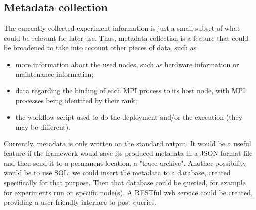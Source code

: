 \subsection{Metadata collection}
The currently collected experiment information is just a small subset
of what could be relevant for later use. Thus, metadata collection is
a feature that could be broadened to take into account other pieces of
data, such as
\begin{itemize}
\item more information about the used nodes, such as hardware
information or maintenance information;
\item data regarding the binding of each MPI process to its host node,
with MPI processes being identified by their rank;
\item the workflow script used to do the deployment and/or the
execution (they may be different).
\end{itemize}
Currently, metadata is only written on the standard output. It would
be a useful feature if the framework would save its produced metadata
in a JSON format file and then send it to a permanent location, a
"trace archive". Another possibility would be to use SQL: we could
insert the metadata to a database, created specifically for that
purpose. Then that database could be queried, for example for
experiments run on specific node(s). A RESTful web service could be
created, providing a user-friendly interface to post queries.
